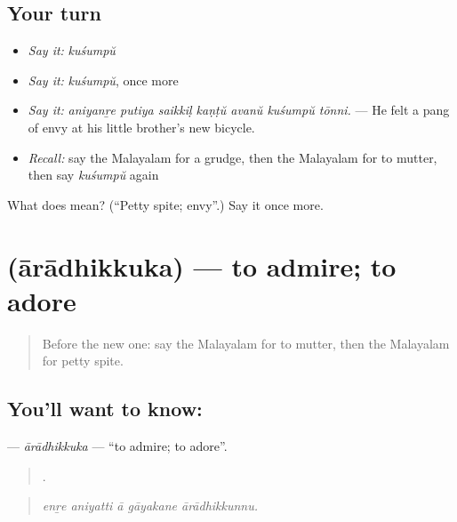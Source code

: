 \subsection*{Your turn}
\begin{itemize}
\raggedright
  \item \emph{Say it:} \emph{kuśumpŭ}
  \item \emph{Say it:} \emph{kuśumpŭ}, once more
  \item \emph{Say it:} \emph{aniyanṟe putiya saikkiḷ kaṇṭŭ avanŭ kuśumpŭ tōnni.} — He felt a pang of envy at his little brother's new bicycle.
  \item \emph{Recall:} say the Malayalam for a grudge, then the Malayalam for to mutter, then say \emph{kuśumpŭ} again
\end{itemize}

\begin{tcolorbox}[breakable,colback=teal!4,colframe=teal!35!black,title={Before you move on}]
What does  mean? (\textquotedblleft{}Petty spite; envy\textquotedblright{}.) Say it once more.
\end{tcolorbox}
\section[\texorpdfstring{\ml{ആരാധിക്കുക} (ārādhikkuka)}{ആരാധിക്കുക (ārādhikkuka)}]{ (ārādhikkuka) — to admire; to adore}

\label{lesson:ML-C523-aradhikkuka}



\begin{quote}
Before the new one: say the Malayalam for to mutter, then the Malayalam for petty spite.
\end{quote}

\subsection*{You'll want to know: }
\textbf{} — \emph{ārādhikkuka} — \textquotedblleft{}to admire; to adore\textquotedblright{}.

\begin{quote}
    .
\end{quote}

\begin{quote}
\emph{enṟe aniyatti ā gāyakane ārādhikkunnu.}
\end{quote}

